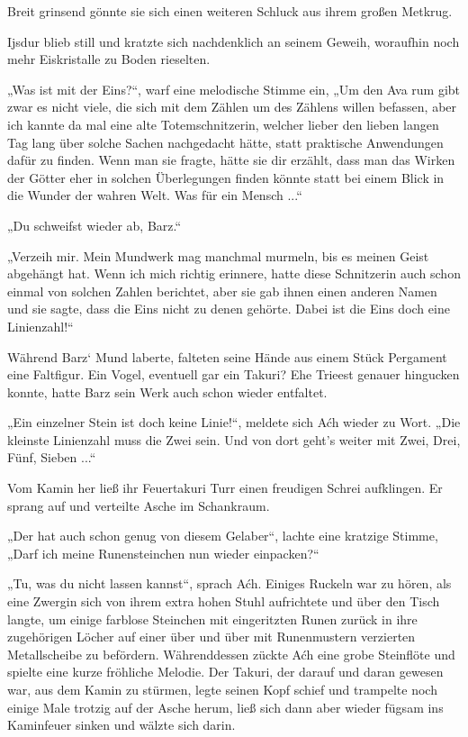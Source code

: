 Breit grinsend gönnte sie sich einen weiteren Schluck aus ihrem großen Metkrug.

Ijsdur blieb still und kratzte sich nachdenklich an seinem Geweih, woraufhin noch mehr Eiskristalle zu Boden rieselten.

„Was ist mit der Eins?“, warf eine melodische Stimme ein, „Um den Ava rum gibt zwar es nicht viele, die sich mit dem Zählen um des Zählens willen befassen, aber ich kannte da mal eine alte Totemschnitzerin, welcher lieber den lieben langen Tag lang über solche Sachen nachgedacht hätte, statt praktische Anwendungen dafür zu finden. Wenn man sie fragte, hätte sie dir erzählt, dass man das Wirken der Götter eher in solchen Überlegungen finden könnte statt bei einem Blick in die Wunder der wahren Welt. Was für ein Mensch ...“

„Du schweifst wieder ab, Barz.“

„Verzeih mir. Mein Mundwerk mag manchmal murmeln, bis es meinen Geist abgehängt hat. Wenn ich mich richtig erinnere, hatte diese Schnitzerin auch schon einmal von solchen Zahlen berichtet, aber sie gab ihnen einen anderen Namen und sie sagte, dass die Eins nicht zu denen gehörte. Dabei ist die Eins doch eine Linienzahl!“

Während Barz‘ Mund laberte, falteten seine Hände aus einem Stück Pergament eine Faltfigur. Ein Vogel, eventuell gar ein Takuri? Ehe Trieest genauer hingucken konnte, hatte Barz sein Werk auch schon wieder entfaltet.

„Ein einzelner Stein ist doch keine Linie!“, meldete sich Aćh wieder zu Wort. „Die kleinste Linienzahl muss die Zwei sein. Und von dort geht’s weiter mit Zwei, Drei, Fünf, Sieben ...“

Vom Kamin her ließ ihr Feuertakuri Turr einen freudigen Schrei aufklingen. Er sprang auf und verteilte Asche im Schankraum.

„Der hat auch schon genug von diesem Gelaber“, lachte eine kratzige Stimme, „Darf ich meine Runensteinchen nun wieder einpacken?“

„Tu, was du nicht lassen kannst“, sprach Aćh. Einiges Ruckeln war zu hören, als eine Zwergin sich von ihrem extra hohen Stuhl aufrichtete und über den Tisch langte, um einige farblose Steinchen mit eingeritzten Runen zurück in ihre zugehörigen Löcher auf einer über und über mit Runenmustern verzierten Metallscheibe zu befördern. Währenddessen zückte Aćh eine grobe Steinflöte und spielte eine kurze fröhliche Melodie. Der Takuri, der darauf und daran gewesen war, aus dem Kamin zu stürmen, legte seinen Kopf schief und trampelte noch einige Male trotzig auf der Asche herum, ließ sich dann aber wieder fügsam ins Kaminfeuer sinken und wälzte sich darin.

